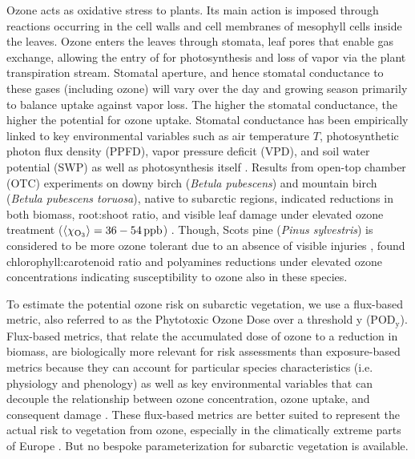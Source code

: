 \documentclass[bg, manuscript]{copernicus}
\begin{document}
Ozone acts as oxidative stress to plants. Its main action is imposed through reactions occurring in the cell walls and cell membranes of mesophyll cells inside the leaves. Ozone enters the leaves through stomata, leaf pores that enable gas exchange, allowing the entry of  for photosynthesis and loss of  vapor via the plant transpiration stream. Stomatal aperture, and hence stomatal conductance to these gases (including ozone) will vary over the day and growing season primarily to balance  uptake against  vapor loss. The higher the stomatal conductance, the higher the potential for ozone uptake. Stomatal conductance has been empirically linked to key environmental variables such as air temperature $T$, photosynthetic photon flux density (PPFD), vapor pressure deficit (VPD), and soil water potential (SWP) as well as photosynthesis itself \citep[e.g.,][]{PTRS:Jarvis1976, BallBerry1987, Emberson2000, ICP:MappingManual2017}. Results from open-top chamber (OTC) experiments on downy birch (\emph{Betula pubescens}) and mountain birch (\emph{Betula pubescens toruosa}), native to subarctic regions, indicated reductions in both biomass, root:shoot ratio, and visible leaf damage under elevated ozone treatment ($\left<\chem{\chi_{O_3}}\right> = 36-54\,\unit{ppb}$) \citep{Amb:Manninen2009}. Though, Scots pine (\emph{Pinus sylvestris}) is considered to be more ozone tolerant due to an absence of visible injuries \citep{Amb:Girgzdiene2009}, \citet{Amb:Manninen2009} found chlorophyll:carotenoid ratio and polyamines reductions under elevated ozone concentrations indicating susceptibility to ozone also in these species.

To estimate the potential ozone risk on subarctic vegetation, we use a flux-based metric, also referred to as the Phytotoxic Ozone Dose over a threshold y ($\mathrm{POD_y}$). Flux-based metrics, that relate the accumulated dose of ozone to a reduction in biomass, are biologically more relevant for risk assessments than exposure-based metrics because they can account for particular species characteristics (i.e. physiology and phenology) as well as key environmental variables that can decouple the relationship between ozone concentration, ozone uptake, and consequent damage \citep{PT:Emberson2020}. These flux-based metrics are better suited to represent the actual risk to vegetation from ozone, especially in the climatically extreme parts of Europe \citep{EP:Simpson2007,GCB:Mills2011,ICP:MappingManual2017}. But no bespoke parameterization for subarctic vegetation is available.
\end{document}
